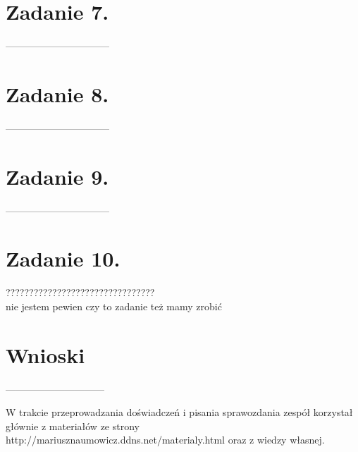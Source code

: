 \documentclass[polish,a4paper]{article}
\begin{document}
\section{Zadanie 7.}
--------------------------------
\section{Zadanie 8.}
--------------------------------
\section{Zadanie 9.}
--------------------------------
\section{Zadanie 10.}
???????????????????????????????? \\
nie jestem pewien czy to zadanie też mamy zrobić 
\section{Wnioski}
------------------------------





\begin{thebibliography}{9}

  W trakcie przeprowadzania doświadczeń i pisania sprawozdania zespół korzystał głównie z materiałów ze strony http://mariusznaumowicz.ddns.net/materialy.html oraz z wiedzy własnej.

\end{thebibliography}
\end{document}
